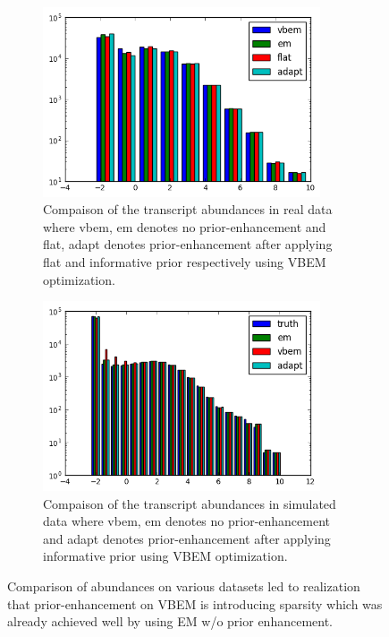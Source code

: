\documentclass{article}
\begin{document}
\begin{figure}
  \centering
  \begin{subfigure}[t]{0.46\textwidth}
    \centering
    \includegraphics[width=0.9\textwidth]{figures/real_realize.png}
    \caption{ \label{fig:real_rl} Compaison of the transcript abundances in real data where vbem, em denotes no prior-enhancement and flat, adapt denotes prior-enhancement after applying flat and informative prior respectively using VBEM optimization.}
  \end{subfigure}
  \qquad
  \begin{subfigure}[t]{0.46\textwidth}
    \centering
      \includegraphics[width=0.9\textwidth]{figures/simulated_realize.png}
      \caption{\label{fig:sim_rl} Compaison of the transcript abundances in simulated data where vbem, em denotes no prior-enhancement and adapt denotes prior-enhancement after applying informative prior using VBEM optimization.}
  \end{subfigure}
  \caption{\label{fig:rl} Comparison of abundances on various datasets led to realization that prior-enhancement on VBEM is introducing sparsity which was already achieved well by using EM w/o prior enhancement.}
\end{figure}
\end{document}
